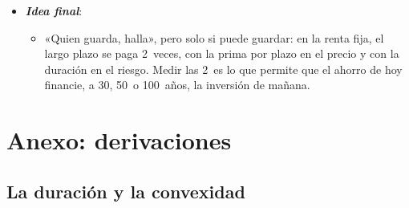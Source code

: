 \documentclass[11pt]{article}
\begin{document}
\begin{itemize}
\begin{itemize}
  \item Quien olvida el riesgo de tipo de interés, que mide la duración, lo descubre de golpe: la subida de 2022 y 2023 dio a los bonos largos sus peores años en décadas, y Silicon Valley Bank no pudo guardar los suyos hasta el vencimiento.
  \end{itemize}
\item \textbf{\emph{Idea final}}:
  \begin{itemize}
  \item «Quien guarda, halla», pero solo si puede guardar: en la renta fija, el largo plazo se paga 2~veces, con la prima por plazo en el precio y con la duración en el riesgo. Medir las 2~es lo que permite que el ahorro de hoy financie, a 30, 50~o 100~años, la inversión de mañana.
  \end{itemize}
\end{itemize}

\clearpage
\appendix

\section{Anexo: derivaciones}\label{anexo:derivaciones}

\subsection{La duración y la convexidad}
\end{document}
